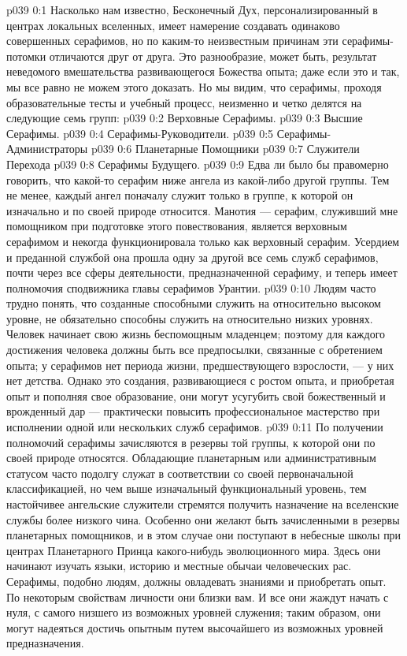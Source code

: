 \author{Мелхиседек}
\vs p039 0:1 Насколько нам известно, Бесконечный Дух, персонализированный в центрах локальных вселенных, имеет намерение создавать одинаково совершенных серафимов, но по каким\hyp{}то неизвестным причинам эти серафимы\hyp{}потомки отличаются друг от друга. Это разнообразие, может быть, результат неведомого вмешательства развивающегося Божества опыта; даже если это и так, мы все равно не можем этого доказать. Но мы видим, что серафимы, проходя образовательные тесты и учебный процесс, неизменно и четко делятся на следующие семь групп:
\vs p039 0:2 \bibnobreakspace Верховные Серафимы.
\vs p039 0:3 \bibnobreakspace Высшие Серафимы.
\vs p039 0:4 \bibnobreakspace Серафимы\hyp{}Руководители.
\vs p039 0:5 \bibnobreakspace Серафимы\hyp{}Администраторы
\vs p039 0:6 \bibnobreakspace Планетарные Помощники
\vs p039 0:7 \bibnobreakspace Служители Перехода
\vs p039 0:8 \bibnobreakspace Серафимы Будущего.
\vs p039 0:9 \pc Едва ли было бы правомерно говорить, что какой\hyp{}то серафим ниже ангела из какой\hyp{}либо другой группы. Тем не менее, каждый ангел поначалу служит только в группе, к которой он изначально и по своей природе относится. Манотия --- серафим, служивший мне помощником при подготовке этого повествования, является верховным серафимом и некогда функционировала только как верховный серафим. Усердием и преданной службой она прошла одну за другой все семь служб серафимов, почти через все сферы деятельности, предназначенной серафиму, и теперь имеет полномочия сподвижника главы серафимов Урантии.
\vs p039 0:10 Людям часто трудно понять, что созданные способными служить на относительно высоком уровне, не обязательно способны служить на относительно низких уровнях. Человек начинает свою жизнь беспомощным младенцем; поэтому для каждого достижения человека должны быть все предпосылки, связанные с обретением опыта; у серафимов нет периода жизни, предшествующего взрослости, --- у них нет детства. Однако это создания, развивающиеся с ростом опыта, и приобретая опыт и пополняя свое образование, они могут усугубить свой божественный и врожденный дар --- практически повысить профессиональное мастерство при исполнении одной или нескольких служб серафимов.
\vs p039 0:11 По получении полномочий серафимы зачисляются в резервы той группы, к которой они по своей природе относятся. Обладающие планетарным или административным статусом часто подолгу служат в соответствии со своей первоначальной классификацией, но чем выше изначальный функциональный уровень, тем настойчивее ангельские служители стремятся получить назначение на вселенские службы более низкого чина. Особенно они желают быть зачисленными в резервы планетарных помощников, и в этом случае они поступают в небесные школы при центрах Планетарного Принца какого\hyp{}нибудь эволюционного мира. Здесь они начинают изучать языки, историю и местные обычаи человеческих рас. Серафимы, подобно людям, должны овладевать знаниями и приобретать опыт. По некоторым свойствам личности они близки вам. И все они жаждут начать с нуля, с самого низшего из возможных уровней служения; таким образом, они могут надеяться достичь опытным путем высочайшего из возможных уровней предназначения.
